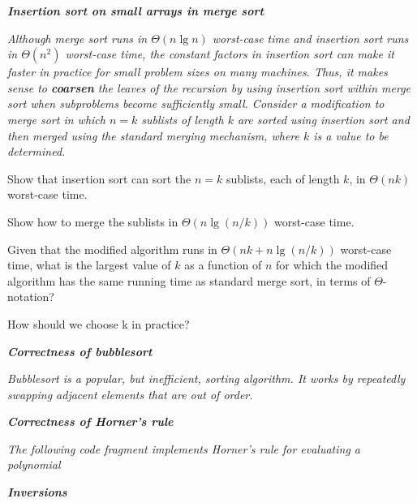 \begin{description}
   {\bfseries \itshape Insertion sort on small arrays in merge sort}

    {\itshape Although merge sort runs in $\Theta(n \lg n)$ worst-case time and insertion sort runs in $\Theta(n^2)$ worst-case time, the constant factors in insertion sort can make it faster in practice for small problem sizes on many machines. Thus, it makes sense to {\bfseries coarsen} the leaves of the recursion by using insertion sort within merge sort when subproblems become sufficiently small. Consider a modification to merge sort in which $n=k$ sublists of length $k$ are sorted using insertion sort and then merged using the standard merging mechanism, where $k$ is a value to be determined.
      \begin{Al}
        \item Show that insertion sort can sort the $n=k$ sublists, each of length $k$, in $\Theta (nk)$  worst-case time.
        \item Show how to merge the sublists in $\Theta (n\lg (n/k))$ worst-case time.
        \item Given that the modified algorithm runs in $\Theta(nk + n\lg (n/k))$ worst-case time, what is the largest value of $k$ as a function of $n$ for which the modified algorithm has the same running time as standard merge sort, in terms of $\Theta$-notation?
        \item How should we choose k in practice?
      \end{Al}
    }

    \begin{pbrev}
      
    \end{pbrev}

   {\bfseries \itshape Correctness of bubblesort}

    {\itshape Bubblesort is a popular, but inefficient, sorting algorithm. It works by repeatedly
    swapping adjacent elements that are out of order.}

    \begin{pbrev}
      
    \end{pbrev}

   {\bfseries \itshape Correctness of Horner’s rule}

    {\itshape The following code fragment implements Horner’s rule for evaluating a polynomial}

    \begin{pbrev}
      
    \end{pbrev}

   {\bfseries \itshape Inversions}

    \begin{pbrev}
      
    \end{pbrev}

\end{description}

